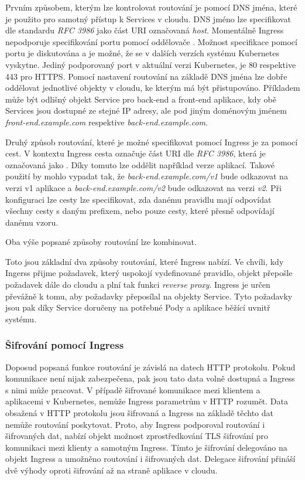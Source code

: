 Prvním způsobem, kterým lze kontrolovat routování je pomocí DNS jména, které je použito pro samotný přístup k Services v cloudu. DNS jméno lze specifikovat dle standardu \textit{RFC 3986} jako část URI označovaná \textit{host}. Momentálně Ingress nepodporuje specifikování portu pomocí oddělovače \uv{:}. Možnost specifikace pomocí portu je diskutována a je možné, že se v dalších verzích systému Kubernetes vyskytne. Jediný podporovaný port v aktuální verzi Kubernetes, je 80 respektive 443 pro HTTPS. Pomocí nastavení routování na základě DNS jména lze dobře oddělovat jednotlivé objekty v cloudu, ke kterým má být přistupováno. Příkladem může být odlišný objekt Service pro back-end a front-end aplikace, kdy obě Services jsou dostupné ze stejné IP adresy, ale pod jiným doménovým jménem \textit{front-end.example.com} respektive \textit{back-end.example.com}.

Druhý způsob routování, které je možné specifikovat pomocí Ingress je za pomocí cest. V kontextu Ingress cesta označuje část URI dle \textit{RFC 3986}, která je označovaná jako . Díky tomuto lze oddělit například verze aplikací. Takové použití by mohlo vypadat tak, že \textit{back-end.example.com/v1} bude odkazovat na verzi v1 aplikace a \textit{back-end.example.com/v2} bude odkazovat na verzi \textit{v2}. Při konfiguraci lze cesty lze specifikovat, zda danému pravidlu mají odpovídat všechny cesty s daným prefixem, nebo pouze cesty, které přesně odpovídají danému vzoru. \cite{thekubernetesauthors_2022_ingress}

Oba výše popsané způsoby routování lze kombinovat.

Toto jsou základní dva způsoby routování, které Ingress nabízí. Ve chvíli, kdy Ingerss přijme požadavek, který uspokojí vydefinované pravidlo, objekt přepošle požadavek dále do cloudu a plní tak funkci \textit{reverse proxy}. Ingress je určen převážně k tomu, aby požadavky přeposílal na objekty Service. Tyto požadavky jsou pak díky Service doručeny na potřebné Pody a aplikace běžící uvnitř systému. %

\subsubsection{Šifrování pomocí Ingress}
Doposud popsaná funkce routování je závislá na datech HTTP protokolu. Pokud komunikace není nijak zabezpečena, pak jsou tato data volně dostupná a Ingress s nimi může pracovat. V případě šifrované komunikace mezi klientem a aplikacemi v Kubernetes, nemůže Ingress parametrům v HTTP rozumět. Data obsažená v HTTP protokolu jsou šifrovaná a Ingress na základě těchto dat nemůže routování poskytovat. Proto, aby Ingress podporoval routování i šifrovaných dat, nabízí objekt možnost zprostředkování TLS šifrování pro komunikaci mezi klienty a samotným Ingress. Tímto je šifrování delegováno na objekt Ingress a umožněno routování i šifrovaných dat. Delegace šifrování přináší dvě výhody oproti šifrování až na straně aplikace v cloudu. \cite{poulton_2022_the}

